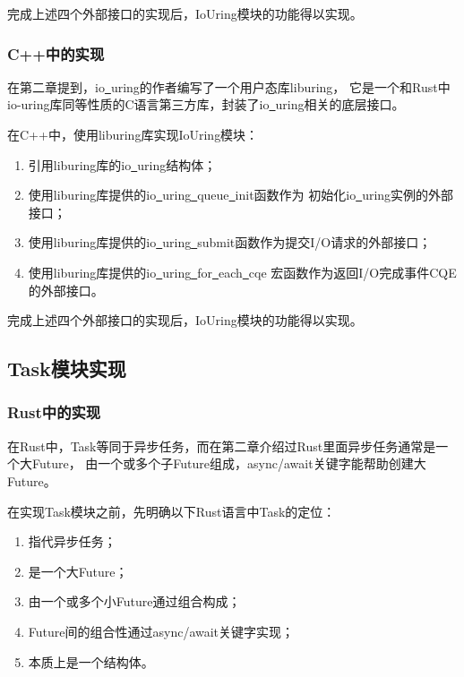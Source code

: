 \documentclass[supercite]{HustGraduPaper}
\theoremstyle{definition}
\begin{document}
完成上述四个外部接口的实现后，IoUring模块的功能得以实现。\par

\subsubsection{C++中的实现}

在第二章提到，io\underline{~}uring的作者编写了一个用户态库liburing，
它是一个和Rust中io-uring库同等性质的C语言第三方库，封装了io\underline{~}uring相关的底层接口。\par

在C++中，使用liburing库实现IoUring模块：

\begin{enumerate}[label={(\arabic*)}]
  \item 引用liburing库的io\underline{~}uring结构体；
  \item 使用liburing库提供的io\underline{~}uring\underline{~}queue\underline{~}init函数作为
    初始化io\underline{~}uring实例的外部接口；
  \item 使用liburing库提供的io\underline{~}uring\underline{~}submit函数作为提交I/O请求的外部接口；
  \item 使用liburing库提供的io\underline{~}uring\underline{~}for\underline{~}each\underline{~}cqe
    宏函数作为返回I/O完成事件CQE的外部接口。
\end{enumerate}

完成上述四个外部接口的实现后，IoUring模块的功能得以实现。\par

\subsection{Task模块实现}

\subsubsection{Rust中的实现}

在Rust中，Task等同于异步任务，而在第二章介绍过Rust里面异步任务通常是一个大Future，
由一个或多个子Future组成，async/await关键字能帮助创建大Future。\par

在实现Task模块之前，先明确以下Rust语言中Task的定位：
\begin{enumerate}[label={(\arabic*)}]
  \item 指代异步任务；
  \item 是一个大Future；
  \item 由一个或多个小Future通过组合构成；
  \item Future间的组合性通过async/await关键字实现；
  \item 本质上是一个结构体。
\end{enumerate}
\end{document}

